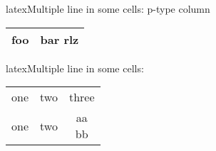 \documentclass[10pt,a4paper]{article}
\begin{document}
\begin{multicols}{3}
\begin{codebox}{latex}{Multiple line in some cells: p-type column}
\begin{tabular}{l|p{15mm}}
\hline
foo & bar \newline rlz \\
\hline
\end{tabular}

\end{codebox}


\begin{codebox}{latex}{Multiple line in some cells: \shortstack}
\begin{tabular}{ccc}
one & two & three \\
one & two & \shortstack{aa \\ bb}\\
\end{tabular}

\end{codebox}


\AtNextBibliography{\footnotesize}
\printbibliography  
\end{multicols}
\end{document}

